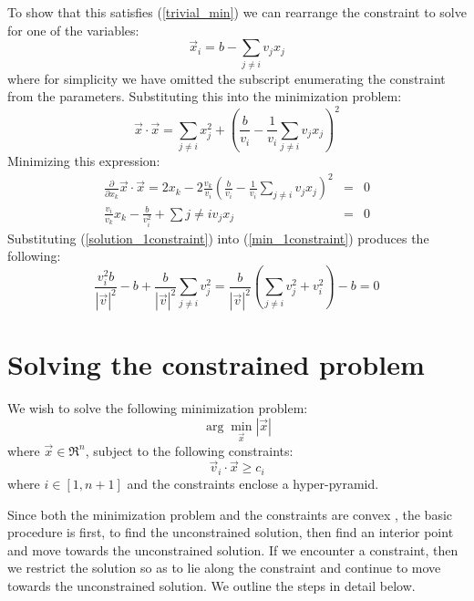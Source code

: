 \documentclass{article}
\begin{document}
To show that this satisfies (\ref{trivial_min}) we can rearrange the constraint
to solve for one of the variables:
\begin{equation}
	\vec x_i = b - \sum_{j \ne i} v_j x_j
\end{equation}
where for simplicity we have omitted the subscript enumerating the constraint
from the parameters.
Substituting this into the minimization problem:
\begin{equation}
	\vec x \cdot \vec x = \sum_{j \ne i} x_j^2 + 
	\left (\frac{b}{v_i} - \frac{1}{v_i} \sum_{j \ne i} v_j x_j \right )^2
\end{equation}
Minimizing this expression:
\begin{eqnarray}
	\frac{\partial}{\partial x_k} \vec x \cdot \vec x = 2 x_k - 2 \frac{v_k}{v_i} \left (\frac{b}{v_i} - \frac{1}{v_i} \sum_{j \ne i} v_j x_j \right )^2 
	& = & 0 \\
	\frac{v_i}{v_k} x_k - \frac{b}{v_i^2} + \sum{j \ne i} v_j x_j & = & 0
	\label{min_1constraint}
\end{eqnarray}
Substituting (\ref{solution_1constraint}) into (\ref{min_1constraint})
produces the following:
\begin{equation}
	\frac{v_i^2 b}{|\vec v|^2} - b + \frac{b}{|\vec v|^2} \sum_{j \ne i} v_j^2 
    = \frac{b}{|\vec v|^2} \left (\sum_{j \ne i} v_j^2 + v_i^2 \right ) - b = 0
\end{equation}

\section{Solving the constrained problem}

We wish to solve the following minimization problem:
\begin{equation}
	\arg \min_{\vec x} |\vec x|
\end{equation}
where $\vec x \in \Re^n$, subject to the following constraints:
\begin{equation}
	\vec v_i \cdot \vec x \ge c_i
\end{equation}
where $i \in [1, n+1]$ and the constraints enclose a hyper-pyramid.

Since both the minimization problem and the constraints are convex 
\citep{Boyd_etal2004}, the basic procedure is first, to find the unconstrained
solution, then find an interior point and move towards the unconstrained
solution. If we encounter a constraint, then we restrict the solution so as
to lie along the constraint and continue to move towards the unconstrained
solution. We outline the steps in detail below.
\end{document}
